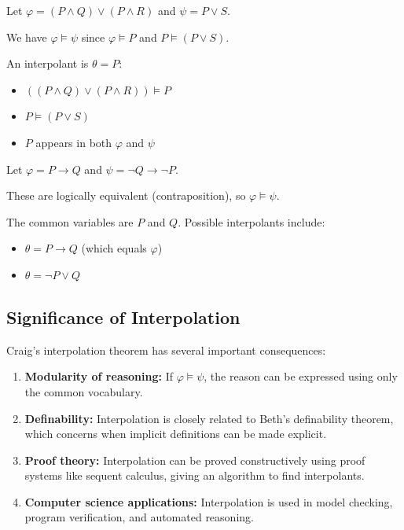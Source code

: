 \begin{example}
Let $\varphi = (P \wedge Q) \vee (P \wedge R)$ and $\psi = P \vee S$.

We have $\varphi \models \psi$ since $\varphi \models P$ and $P \models (P \vee S)$.

An interpolant is $\theta = P$:
\begin{itemize}
  \item $((P \wedge Q) \vee (P \wedge R)) \models P$ \checkmark
  \item $P \models (P \vee S)$ \checkmark
  \item $P$ appears in both $\varphi$ and $\psi$ \checkmark
\end{itemize}
\end{example}

\begin{example}
Let $\varphi = P \rightarrow Q$ and $\psi = \neg Q \rightarrow \neg P$.

These are logically equivalent (contraposition), so $\varphi \models \psi$.

The common variables are $P$ and $Q$. Possible interpolants include:
\begin{itemize}
  \item $\theta = P \rightarrow Q$ (which equals $\varphi$)
  \item $\theta = \neg P \vee Q$
\end{itemize}
\end{example}

\subsection{Significance of Interpolation}

\begin{remark}
Craig's interpolation theorem has several important consequences:

\begin{enumerate}
  \item \textbf{Modularity of reasoning:} If $\varphi \models \psi$, the reason
        can be expressed using only the common vocabulary.

  \item \textbf{Definability:} Interpolation is closely related to Beth's
        definability theorem, which concerns when implicit definitions can be
        made explicit.

  \item \textbf{Proof theory:} Interpolation can be proved constructively using
        proof systems like sequent calculus, giving an algorithm to find
        interpolants.

  \item \textbf{Computer science applications:} Interpolation is used in model
        checking, program verification, and automated reasoning.
\end{enumerate}
\end{remark}

